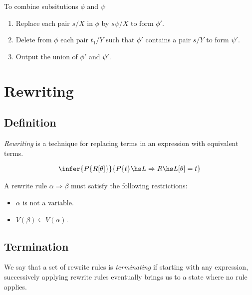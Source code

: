 \documentclass{article}
\begin{document}
To combine subsitutions $\phi$ and $\psi$
\begin{enumerate}
    \item Replace each pair $s/X$ in $\phi$ by $s\psi/X$ to form $\phi'$.
    \item Delete from $\phi$ each pair $t_1/Y$ such that $\phi'$ contains a pair $s/Y$ to form $\psi'$.
    \item Output the union of $\phi'$ and $\psi'$.
\end{enumerate}

\section{Rewriting}

\subsection{Definition}

\begin{definition}
    \emph{Rewriting} is a technique for replacing terms in an expression with equivalent terms.
\end{definition}

\begin{theorem}
    \begin{align*}
        \infer{P\{R[\theta]\}}{P\{t\}\hs L\Rightarrow R\hs L[\theta]=t}
    \end{align*} 
\end{theorem}

\begin{definition}
    A rewrite rule $\alpha\Rightarrow\beta$ must satisfy the following restrictions:
    \begin{itemize}
        \item $\alpha$ is not a variable.
        \item $V(\beta)\subseteq V(\alpha)$.
    \end{itemize}
\end{definition}

\subsection{Termination}

\begin{definition}
    We say that a set of rewrite rules is \emph{terminating} if starting with any expression,
    successively applying rewrite rules eventually brings us to a state where no rule applies. 
\end{definition}
\end{document}
